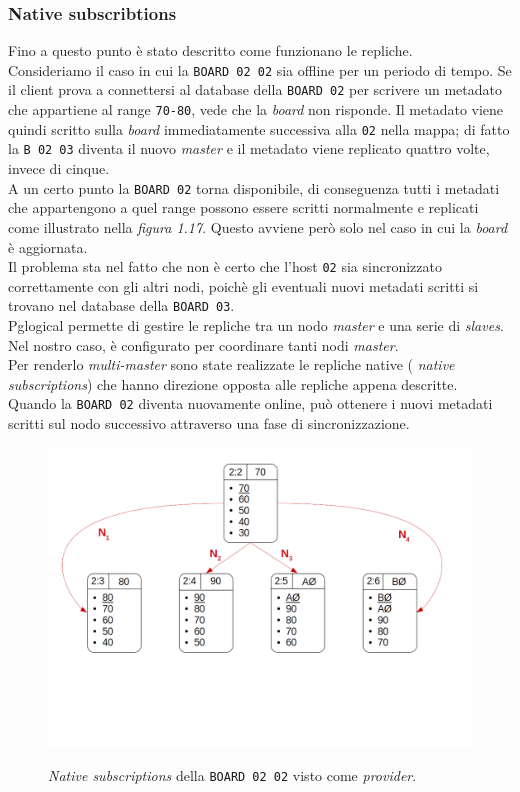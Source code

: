 \subsubsection{Native subscribtions}
Fino a questo punto \`{e} stato descritto come funzionano le repliche.\\
Consideriamo il caso in cui la \verb"BOARD 02 02" sia offline per un periodo di tempo. Se il client prova a connettersi al database della \verb"BOARD 02" per scrivere un metadato che appartiene al range \verb"70-80", vede che la \textit{board} non risponde. Il metadato viene quindi scritto sulla \textit{board} immediatamente successiva alla \verb"02" nella mappa; di fatto la \verb"B 02 03" diventa il nuovo \textit{master} e il metadato viene replicato quattro volte, invece di cinque.\\
A un certo punto la \verb"BOARD 02" torna disponibile, di conseguenza tutti i metadati che appartengono a quel range possono essere scritti normalmente e replicati come illustrato nella \textit{figura 1.17}. Questo avviene per\`{o} solo nel caso in cui la \textit{board} \`{e} aggiornata.\\
Il problema sta nel fatto che non \`{e} certo che l'host \verb"02" sia sincronizzato correttamente con gli altri nodi, poich\`{e} gli eventuali nuovi metadati scritti si trovano nel database della \verb"BOARD 03".\\
Pglogical permette di gestire le repliche tra un nodo \textit{master} e una serie di \textit{slaves}. Nel nostro caso, \`{e} configurato per coordinare tanti nodi \textit{master}. \\
Per renderlo \textit{multi-master} sono state realizzate le repliche native ( \textit{native subscriptions}) che hanno direzione opposta alle repliche appena descritte.\\
Quando la \verb"BOARD 02" diventa nuovamente online, pu\`{o} ottenere i nuovi metadati scritti sul nodo successivo attraverso una fase di sincronizzazione.

\begin{figure}[htbp]
\centering
\includegraphics[scale=0.40]{img/prov_native.png}\\
\caption{\textit{Native subscriptions} della \verb"BOARD 02 02" visto come \textit{provider}. \label{figura1.19}}
\end{figure}

